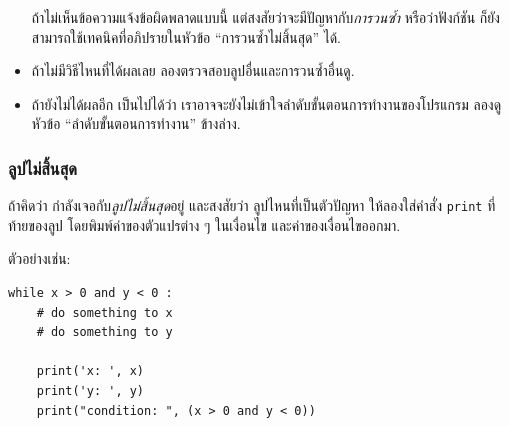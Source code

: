 \begin{itemize}
ถ้าไม่เห็นข้อความแจ้งข้อผิดพลาดแบบนี้ แต่สงสัยว่าจะมีปัญหากับ\textit{การวนซ้ำ} หรือว่าฟังก์ชัน
ก็ยังสามารถใช้เทคนิคที่อภิปรายในหัวข้อ ``การวนซ้ำไม่สิ้นสุด'' ได้.


\item ถ้าไม่มีวิธีไหนที่ได้ผลเลย 
ลองตรวจสอบลูปอื่นและการวนซ้ำอื่นดู.


\item ถ้ายังไม่ได้ผลอีก
เป็นไปได้ว่า เราอาจจะยังไม่เข้าใจลำดับขั้นตอนการทำงานของโปรแกรม
ลองดูหัวข้อ ``ลำดับขั้นตอนการทำงาน'' ข้างล่าง.

\end{itemize}


\subsubsection{ลูปไม่สิ้นสุด}


ถ้าคิดว่า กำลังเจอกับ\textit{ลูปไม่สิ้นสุด}อยู่
และสงสัยว่า ลูปไหนที่เป็นตัวปัญหา
ให้ลองใส่คำสั่ง \texttt{print} ที่ท้ายของลูป โดยพิมพ์ค่าของตัวแปรต่าง ๆ ในเงื่อนไข และค่าของเงื่อนไขออกมา.

ตัวอย่างเช่น:

\begin{verbatim}
while x > 0 and y < 0 :
    # do something to x
    # do something to y

    print('x: ', x)
    print('y: ', y)
    print("condition: ", (x > 0 and y < 0))
\end{verbatim}
%

